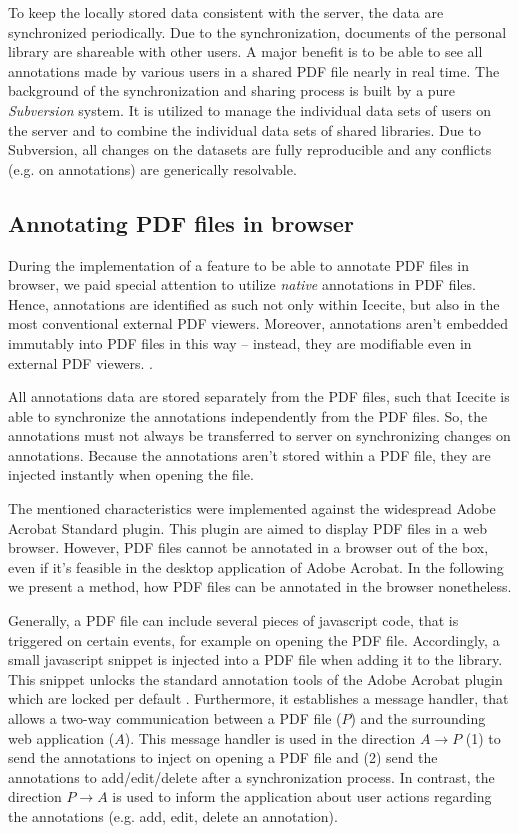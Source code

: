 To keep the locally stored data consistent with the server, the data are synchronized periodically. Due to the synchronization, documents of the personal library are shareable with other users. A major benefit is to be able to see all annotations made by various users in a shared PDF file nearly in real time. The background of the synchronization and sharing process is built by a pure \textit{Subversion} system. It is utilized to manage the individual data sets of users on the server and to combine the individual data sets of shared libraries. Due to Subversion, all changes on the datasets are fully  reproducible and any conflicts (e.g. on annotations) are generically resolvable.

\subsection{Annotating PDF files in browser} \label{sec:annotations} 
During the implementation of a feature to be able to annotate PDF files in browser, we paid special attention to utilize \textit{native} annotations in PDF files. Hence, annotations are identified as such not only within Icecite, but also in the most conventional external PDF viewers. Moreover, annotations aren't embedded immutably into PDF files in this way -- instead, they are modifiable even in external PDF viewers. . 

All annotations data are stored separately from the PDF files, such that Icecite is able to synchronize the annotations independently from the PDF files. So, the annotations must not always be transferred to server on synchronizing changes on annotations. Because the annotations aren't stored within a PDF file, they are injected instantly when opening the file.

The mentioned characteristics were implemented against the widespread Adobe Acrobat Standard plugin. This plugin are aimed to display PDF files in a web browser. However, PDF files cannot be annotated in a browser out of the box, even if it's feasible in the desktop application of Adobe Acrobat. In the following we present a method, how PDF files can be annotated in the browser nonetheless.

Generally, a PDF file can include several pieces of javascript code, that is triggered on certain events, for example on opening the PDF file. Accordingly, a small javascript snippet is injected into a PDF file when adding it to the library. This snippet unlocks the standard annotation tools of the Adobe Acrobat plugin which are locked per default . Furthermore, it establishes a message handler, that allows a two-way communication between a PDF file ($P$) and the surrounding web application ($A$). This message handler is used in the direction $A \rightarrow P$ (1) to send the annotations to inject on opening a PDF file and (2) send the annotations to add/edit/delete after a synchronization process. In contrast, the direction $P \rightarrow A$ is used to inform the application about user actions regarding the annotations (e.g. add, edit, delete an annotation).